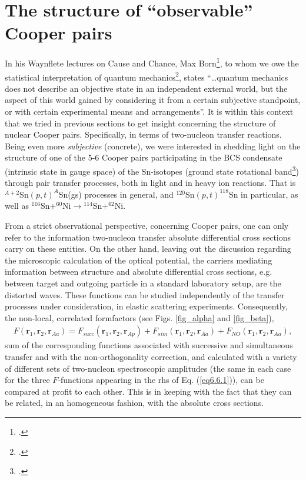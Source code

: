 \section{The structure of ``observable'' Cooper pairs}\label{S6.5.4}
In his Waynflete lectures on Cause and Chance, Max Born\footnote{\cite{Born:48}.}, to whom we owe the statistical interpretation of quantum mechanics\footnote{\cite{Born:64,Pais:86}.}, states ``\dots quantum mechanics does not describe an objective state in an independent external world, but the aspect of this world gained by considering it from a certain subjective standpoint, or with certain experimental means and arrangements''. It is within this context that we tried in previous sections to get insight concerning the structure of nuclear Cooper pairs. Specifically, in terms of two-nucleon transfer reactions. Being even more \textit{subjective} (concrete), we were interested in shedding light on the structure of one of the 5-6 Cooper pairs participating in the BCS condensate (intrinsic state in gauge space) of the Sn-isotopes (ground state rotational band\footnote{\cite{Potel:13b,Potel:17}.}) through pair transfer processes, both in light and in heavy ion reactions. That is $^{A+2}$Sn$(p,t)^{A}$Sn(gs) processes in general, and $^{120}$Sn$(p,t)^{118}$Sn in particular, as well as  $^{116}$Sn+$^{60}$Ni$\to$$^{114}$Sn+$^{62}$Ni. 


From a strict observational perspective, concerning Cooper pairs, one can only refer to the information two-nucleon transfer absolute differential cross sections carry on these entities. On the other hand, leaving out the discussion regarding the microscopic calculation of the optical potential, the carriers mediating information between structure and absolute differential cross sections, e.g. between target and outgoing particle in a standard laboratory setup, are the distorted waves. These functions can be studied independently of the transfer processes under consideration, in elastic scattering experiments. Consequently, the non-local, correlated formfactors (see Figs. \ref{fig_alpha} and \ref{fig_beta}),
\begin{align}\label{eq6.6.1}
F(\mathbf r_1,\mathbf r_2,\mathbf r_{Aa})=F_{succ}(\mathbf r_1,\mathbf r_2,\mathbf r_{Ap})+F_{sim}(\mathbf r_1,\mathbf r_2,\mathbf r_{Aa})+F_{NO}(\mathbf r_1,\mathbf r_2,\mathbf r_{Aa}),
\end{align}
sum of the corresponding functions associated with successive and simultaneous transfer  and with the non-orthogonality correction, and calculated with a variety of different sets of two-nucleon spectroscopic amplitudes (the same in each case for the three $F$-functions appearing in the rhs of Eq. (\ref{eq6.6.1})), can be compared at profit to each other. This is in keeping with the fact that they can be related, in an homogeneous fashion, with the absolute cross sections.

